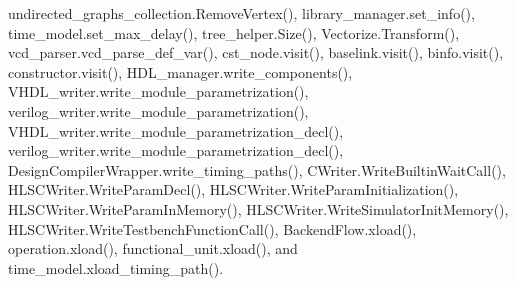 undirected\+\_\+graphs\+\_\+collection.\+Remove\+Vertex(), library\+\_\+manager.\+set\+\_\+info(), time\+\_\+model.\+set\+\_\+max\+\_\+delay(), tree\+\_\+helper.\+Size(), Vectorize.\+Transform(), vcd\+\_\+parser.\+vcd\+\_\+parse\+\_\+def\+\_\+var(), cst\+\_\+node.\+visit(), baselink.\+visit(), binfo.\+visit(), constructor.\+visit(), H\+D\+L\+\_\+manager.\+write\+\_\+components(), V\+H\+D\+L\+\_\+writer.\+write\+\_\+module\+\_\+parametrization(), verilog\+\_\+writer.\+write\+\_\+module\+\_\+parametrization(), V\+H\+D\+L\+\_\+writer.\+write\+\_\+module\+\_\+parametrization\+\_\+decl(), verilog\+\_\+writer.\+write\+\_\+module\+\_\+parametrization\+\_\+decl(), Design\+Compiler\+Wrapper.\+write\+\_\+timing\+\_\+paths(), C\+Writer.\+Write\+Builtin\+Wait\+Call(), H\+L\+S\+C\+Writer.\+Write\+Param\+Decl(), H\+L\+S\+C\+Writer.\+Write\+Param\+Initialization(), H\+L\+S\+C\+Writer.\+Write\+Param\+In\+Memory(), H\+L\+S\+C\+Writer.\+Write\+Simulator\+Init\+Memory(), H\+L\+S\+C\+Writer.\+Write\+Testbench\+Function\+Call(), Backend\+Flow.\+xload(), operation.\+xload(), functional\+\_\+unit.\+xload(), and time\+\_\+model.\+xload\+\_\+timing\+\_\+path().

